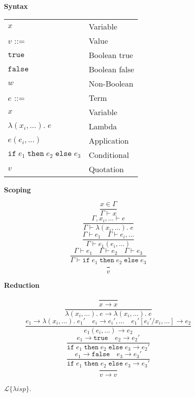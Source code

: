 \documentclass[a4paper]{article}
\newcommand{\lisp}{\ensuremath{\mathcal{L}\{\lambda isp\}}}
\begin{document}
\begin{figure}[h]
\label{fig:lisp}
\caption{\lisp.}

{\bf Syntax}

\begin{tabular}{ll}
$x$ & Variable \\
$v$ ::= & Value \\
\hspace{1em} $\mathtt{true}$ & \hspace{1em} Boolean true \\
\hspace{1em} $\mathtt{false}$ & \hspace{1em} Boolean false \\
\hspace{1em} $w$ & \hspace{1em} Non-Boolean \\
$e$ ::= & Term \\
\hspace{1em} $x$ & \hspace{1em} Variable \\
\hspace{1em} $\lambda(x_i, \dotsc).\;e$ & \hspace{1em} Lambda \\
\hspace{1em} $e(e_i, \dotsc)$ & \hspace{1em} Application \\
\hspace{1em} $\mathtt{if}\;e_1\;\mathtt{then}\;e_2\;\mathtt{else}\;e_3$ & \hspace{1em} Conditional \\
\hspace{1em} $v$ & \hspace{1em} Quotation \\
\end{tabular}

\hrulefill

{\bf Scoping}

$$\frac{x \in \Gamma}{\Gamma \vdash x}$$
$$\frac{\Gamma, x_i, \dotsc \vdash e}{\Gamma \vdash \lambda(x_i, \dotsc).\;e}$$
$$\frac{\Gamma \vdash e_1 \quad \Gamma \vdash e_i, \dotsc}{\Gamma \vdash e_1(e_i, \dotsc)}$$
$$\frac{\Gamma \vdash e_1 \quad \Gamma \vdash e_2 \quad \Gamma \vdash e_3}{\Gamma \vdash \mathtt{if}\;e_1\;\mathtt{then}\;e_2\;\mathtt{else}\;e_3}$$
$$\frac{}{v}$$

\hrulefill

{\bf Reduction}

$$\frac{}{x \rightarrow x}$$
$$\frac{}{\lambda(x_i, \dotsc).\;e \rightarrow \lambda(x_i, \dotsc).\;e}$$
$$\frac{e_1 \rightarrow \lambda(x_i, \dotsc).\;e_1' \quad e_i \rightarrow e_i', \dotsc \quad e_1'[e_i' / x_i, \dotsc] \rightarrow e_2}{e_1(e_i, \dotsc) \rightarrow e_2}$$
$$\frac{e_1 \rightarrow \mathtt{true} \quad e_2 \rightarrow e_2'}{\mathtt{if}\;e_1\;\mathtt{then}\;e_2\;\mathtt{else}\;e_3 \rightarrow e_2'}$$
$$\frac{e_1 \rightarrow \mathtt{false} \quad e_3 \rightarrow e_3'}{\mathtt{if}\;e_1\;\mathtt{then}\;e_2\;\mathtt{else}\;e_3 \rightarrow e_3'}$$
$$\frac{}{v \rightarrow v}$$

\end{figure}
\end{document}
